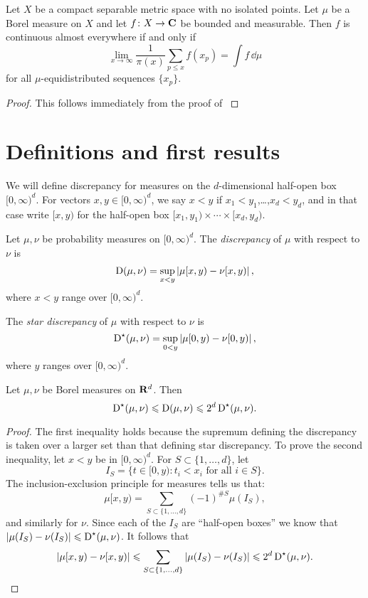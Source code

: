 \begin{theorem}
Let $X$ be a compact separable metric space with no isolated points. Let $\mu$ 
be a Borel measure on $X$ and let $f\colon X\to \mathbf{C}$ be bounded and measurable. 
Then $f$ is continuous almost everywhere if and only if 
\[
	\lim_{x\to \infty} \frac{1}{\pi(x)} \sum_{p\leqslant x} f(x_p) = \int f\, \dd\mu
\]
for all $\mu$-equidistributed sequences $\{x_p\}$. 
\end{theorem}
\begin{proof}
This follows immediately from the proof of \cite[Th.~1]{mazzone-1995}
\end{proof}





\section{Definitions and first results}

We will define discrepancy for measures on the $d$-dimensional half-open box 
$[0,\infty)^d$. For vectors $x,y\in [0,\infty)^d$, we say $x<y$ if 
$x_1<y_1$,\dots,$x_d<y_d$, and in that case write $[x,y)$ for the half-open 
box $[x_1,y_1)\times \cdots \times [x_d,y_d)$. 

\begin{definition}
Let $\mu, \nu$ be probability measures on $[0,\infty)^d$. The 
\emph{discrepancy} of $\mu$ with respect to $\nu$ is 
\[
	\operatorname{D}(\mu,\nu) = \sup_{x < y} \left| \mu[x,y) - \nu[x,y)\right| ,
\]
where $x<y$ range over $[0,\infty)^d$.

The \emph{star discrepancy} of $\mu$ with respect to $\nu$ is 
\[
	\operatorname{D}^\star(\mu,\nu) = \sup_{0<y} \left| \mu[0,y) - \nu[0,y)\right| ,
\]
where $y$ ranges over $[0,\infty)^d$. 
\end{definition}

\begin{lemma}
Let $\mu,\nu$ be Borel measures on $\mathbf{R}^d$. Then 
\[
	\operatorname{D}^\star(\mu,\nu) \leqslant \operatorname{D}(\mu,\nu) \leqslant 2^d \operatorname{D}^\star(\mu,\nu) .
\]
\end{lemma}
\begin{proof}
The first inequality holds because the supremum defining the discrepancy is 
taken over a larger set than that defining star discrepancy. To prove the 
second inequality, let $x<y$ be in $[0,\infty)^d$. For 
$S\subset \{1,\dots,d\}$, let 
\[
	I_S = \{ t \in [0,y) : t_i < x_i \text{ for all }i\in S\} .
\]
The inclusion-exclusion principle for measures tells us that: 
\[
	\mu[x,y) = \sum_{S\subset \{1,\dots,d\}} (-1)^{\# S} \mu(I_S) ,
\]
and similarly for $\nu$. Since each of the $I_S$ are ``half-open boxes'' 
we know that $|\mu(I_S) - \nu(I_S)| \leqslant \operatorname{D}^\star(\mu,\nu)$. It 
follows that 
\[
	|\mu[x,y) - \nu[x,y)| \leqslant \sum_{S\subset \{1,\dots,d\}} |\mu(I_S) - \nu(I_S)| \leqslant 2^d \operatorname{D}^\star(\mu,\nu) .
\]
\end{proof}

